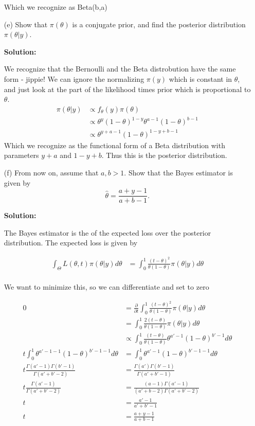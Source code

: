 \documentclass{article}
\begin{document}
\begin{enumerate}
    Which we recognize as Beta(b,a)
   


    
    \item[(e)] Show that $\pi(\theta)$ is a conjugate prior, and find the posterior distribution $\pi(\theta | y)$.
    
    \textbf{Solution:}
    \par
    We recognize that the Bernoulli and the Beta distrobution have the same form - jippie! We can ignore the normalizing $\pi(y)$ which is constant in $\theta$, and just look at the part of the likelihood times prior which is proportional to $\theta$.
    \begin{align*}
        \pi(\theta | y) &\propto f_{\theta}(y) \pi(\theta)\\
        &\propto \theta^y(1-\theta)^{1-y} \theta^{a-1}(1-\theta)^{b-1}\\
        &\propto \theta^{y+a-1}(1-\theta)^{1-y+b-1}
    \end{align*}
    Which we recognize as the functional form of a Beta distribution with parameters $y+a$ and $1-y+b$. Thus this is the posterior distribution.

    \item[(f)] From now on, assume that $a, b > 1$. Show that the Bayes estimator is given by
    \[\hat{\theta} = \frac{a + y - 1}{a + b - 1}.\]

    \textbf{Solution:}
    \par
    The Bayes estimator is the of the expected loss over the posterior distribution. The expected loss is given by  
    
    \begin{align*}
        \int_{\Theta} L(\theta, t) \pi(\theta | y) d\theta &= \int_{0}^{1} \frac{(t - \theta)^2}{\theta(1-\theta)} \pi(\theta | y) d\theta\\
    \end{align*}

    We want to minimize this, so we can differentiate and set to zero
    
    \begin{align*}
        0 &= \frac{\partial}{\partial t} \int_{0}^{1} \frac{(t - \theta)^2}{\theta(1-\theta)} \pi(\theta | y) d\theta\\
        &= \int_{0}^{1} \frac{2(t - \theta)}{\theta(1-\theta)} \pi(\theta | y) d\theta\\
        &\propto \int_{0}^{1} \frac{(t - \theta)}{\theta(1-\theta)} \theta^{a'-1} \left(1 - \theta \right)^{b'- 1} d\theta\\
        t \int_0^1 \theta ^ {a'-1-1} (1-\theta)^{b'-1-1} d\theta &= \int_0^1 \theta^{a'-1} (1-\theta)^{b'-1-1} d\theta\\
        t \frac{\Gamma(a'-1) \Gamma(b'-1)}{\Gamma(a'+b'-2)} &= \frac{\Gamma(a') \Gamma(b'-1)}{\Gamma(a'+b'-1)}\\
        t \frac{\Gamma(a'-1)}{\Gamma(a'+b'-2)} &= \frac{ (a - 1) \Gamma(a' - 1)}{ (a' + b - 2) \Gamma(a'+b'-2)}\\
        t &= \frac{a'- 1}{a' + b' - 1}\\
        t &= \frac{a + y - 1}{a + b - 1}
    \end{align*}


\end{enumerate}
\end{document}
